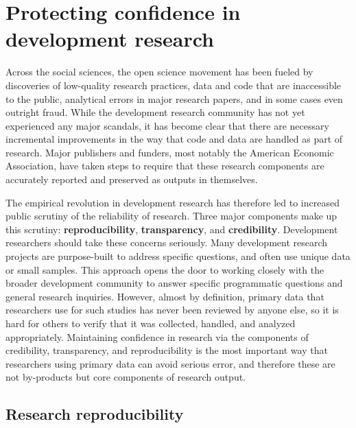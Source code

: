 
\section{Protecting confidence in development research}

Across the social sciences, the open science movement
has been fueled by discoveries of low-quality research practices,
data and code that are inaccessible to the public,
analytical errors in major research papers,
and in some cases even outright fraud.
While the development research community has not yet
experienced any major scandals,
it has become clear that there are necessary incremental improvements
in the way that code and data are handled as part of research.
Major publishers and funders, most notably the American Economic Association,
have taken steps to require that these research components
are accurately reported and preserved as outputs in themselves.

The empirical revolution in development research
has therefore led to increased public scrutiny of the reliability of research.\cite{rogers_2017}
Three major components make up this scrutiny: \textbf{reproducibility}\cite{duvendack2017meant}, \textbf{transparency},\cite{christensen2018transparency} and \textbf{credibility}.\cite{ioannidis2017power}
Development researchers should take these concerns seriously.
Many development research projects are purpose-built to address specific questions,
and often use unique data or small samples.
This approach opens the door to working closely with the broader development community
to answer specific programmatic questions and general research inquiries.
However, almost by definition,
primary data that researchers use for such studies has never been reviewed by anyone else,
so it is hard for others to verify that it was collected, handled, and analyzed appropriately.
Maintaining confidence in research via the components of credibility, transparency, and reproducibility
is the most important way that researchers using primary data can avoid serious error,
and therefore these are not by-products but core components of research output.

\subsection{Research reproducibility}

